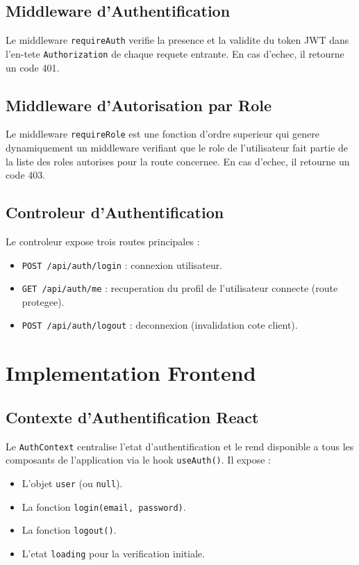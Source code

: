 \documentclass[12pt,a4paper]{report}
\begin{document}
\subsection{Middleware d'Authentification}

Le middleware \texttt{requireAuth} verifie la presence et la validite
du token JWT dans l'en-tete \texttt{Authorization} de chaque requete
entrante. En cas d'echec, il retourne un code 401.

\subsection{Middleware d'Autorisation par Role}

Le middleware \texttt{requireRole} est une fonction d'ordre superieur
qui genere dynamiquement un middleware verifiant que le role de
l'utilisateur fait partie de la liste des roles autorises pour la
route concernee. En cas d'echec, il retourne un code 403.

\subsection{Controleur d'Authentification}

Le controleur expose trois routes principales :
\begin{itemize}
  \item \texttt{POST /api/auth/login} : connexion utilisateur.
  \item \texttt{GET /api/auth/me} : recuperation du profil de
        l'utilisateur connecte (route protegee).
  \item \texttt{POST /api/auth/logout} : deconnexion (invalidation
        cote client).
\end{itemize}

\section{Implementation Frontend}

\subsection{Contexte d'Authentification React}

Le \texttt{AuthContext} centralise l'etat d'authentification et le
rend disponible a tous les composants de l'application via le hook
\texttt{useAuth()}. Il expose :
\begin{itemize}
  \item L'objet \texttt{user} (ou \texttt{null}).
  \item La fonction \texttt{login(email, password)}.
  \item La fonction \texttt{logout()}.
  \item L'etat \texttt{loading} pour la verification initiale.
\end{itemize}
\end{document}
